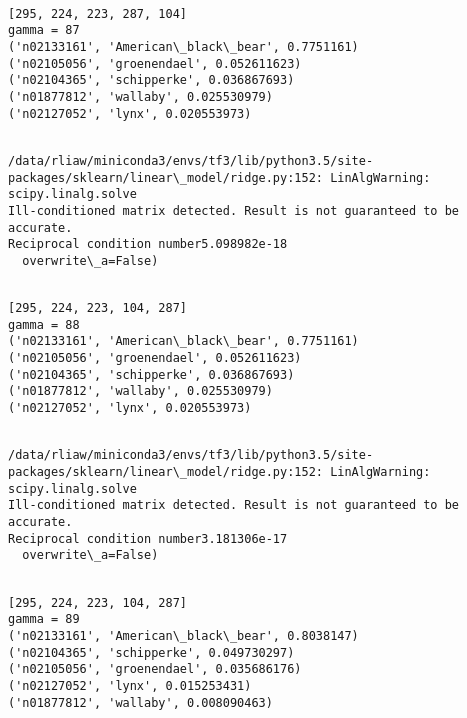 \documentclass[11pt]{article}
\begin{document}
    \begin{Verbatim}[commandchars=\\\{\}]

[295, 224, 223, 287, 104]
gamma = 87
('n02133161', 'American\_black\_bear', 0.7751161)
('n02105056', 'groenendael', 0.052611623)
('n02104365', 'schipperke', 0.036867693)
('n01877812', 'wallaby', 0.025530979)
('n02127052', 'lynx', 0.020553973)


    \end{Verbatim}

    \begin{Verbatim}[commandchars=\\\{\}]
/data/rliaw/miniconda3/envs/tf3/lib/python3.5/site-packages/sklearn/linear\_model/ridge.py:152: LinAlgWarning: scipy.linalg.solve
Ill-conditioned matrix detected. Result is not guaranteed to be accurate.
Reciprocal condition number5.098982e-18
  overwrite\_a=False)

    \end{Verbatim}

    \begin{Verbatim}[commandchars=\\\{\}]

[295, 224, 223, 104, 287]
gamma = 88
('n02133161', 'American\_black\_bear', 0.7751161)
('n02105056', 'groenendael', 0.052611623)
('n02104365', 'schipperke', 0.036867693)
('n01877812', 'wallaby', 0.025530979)
('n02127052', 'lynx', 0.020553973)


    \end{Verbatim}

    \begin{Verbatim}[commandchars=\\\{\}]
/data/rliaw/miniconda3/envs/tf3/lib/python3.5/site-packages/sklearn/linear\_model/ridge.py:152: LinAlgWarning: scipy.linalg.solve
Ill-conditioned matrix detected. Result is not guaranteed to be accurate.
Reciprocal condition number3.181306e-17
  overwrite\_a=False)

    \end{Verbatim}

    \begin{Verbatim}[commandchars=\\\{\}]

[295, 224, 223, 104, 287]
gamma = 89
('n02133161', 'American\_black\_bear', 0.8038147)
('n02104365', 'schipperke', 0.049730297)
('n02105056', 'groenendael', 0.035686176)
('n02127052', 'lynx', 0.015253431)
('n01877812', 'wallaby', 0.008090463)


    \end{Verbatim}
\end{document}
